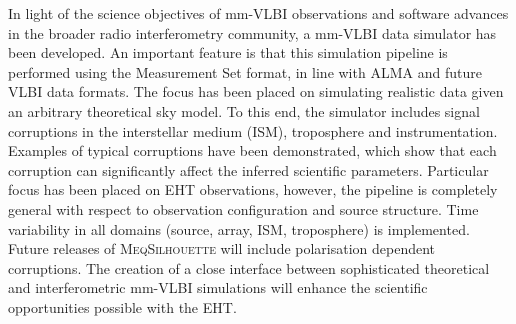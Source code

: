 
In light of the science objectives of mm-VLBI observations and software advances in the broader radio interferometry community, a mm-VLBI data simulator has been developed. An important feature is that this simulation pipeline is performed using the {\sc Measurement Set} format, in line with ALMA and future VLBI data formats. The focus has been placed on simulating realistic data given an arbitrary theoretical sky model. To this end, the simulator includes signal corruptions in the interstellar medium (ISM), troposphere and instrumentation. Examples of typical corruptions have been demonstrated, which show that each corruption can significantly affect the inferred scientific parameters. Particular focus has been placed on EHT observations, however, the pipeline is completely general with respect to observation configuration and source structure. Time variability in all domains (source, array, ISM, troposphere) is implemented.  Future releases of \textsc{MeqSilhouette} will include polarisation dependent corruptions. The creation of a close interface between sophisticated theoretical and interferometric mm-VLBI simulations will enhance the scientific opportunities possible with the EHT.